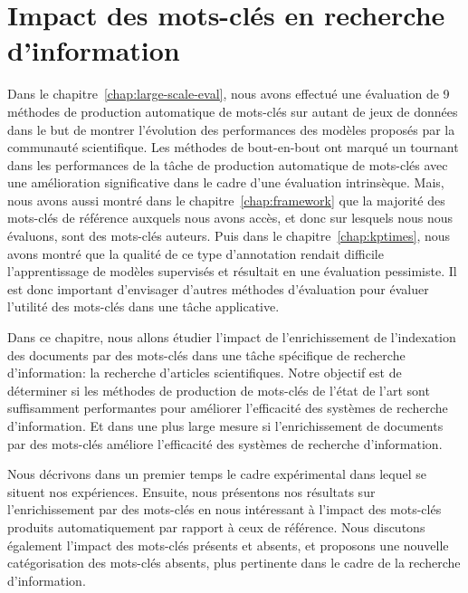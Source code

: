 \chapter{Impact des mots-clés en recherche d'information}\label{chap:ri}

Dans le chapitre~\ref{chap:large-scale-eval}, nous avons effectué une évaluation de 9 méthodes de production automatique de mots-clés sur autant de jeux de données dans le but de montrer l'évolution des performances des modèles proposés par la communauté scientifique.
Les méthodes de bout-en-bout ont marqué un tournant dans les performances de la tâche de production automatique de mots-clés avec une amélioration significative dans le cadre d'une évaluation intrinsèque.
Mais, nous avons aussi montré dans le chapitre~\ref{chap:framework} que la majorité des mots-clés de référence auxquels nous avons accès, et donc sur lesquels nous nous évaluons, sont des mots-clés auteurs.
Puis dans le chapitre~\ref{chap:kptimes}, nous avons montré que la qualité de ce type d'annotation rendait difficile l'apprentissage de modèles supervisés et résultait en une évaluation pessimiste. Il est donc important d'envisager d'autres méthodes d'évaluation pour évaluer l'utilité des mots-clés dans une tâche applicative.

Dans ce chapitre, nous allons étudier l'impact de l'enrichissement de l'indexation des documents par des mots-clés dans une tâche spécifique de recherche d'information: la recherche d'articles scientifiques.
Notre objectif est de déterminer si les méthodes de production de mots-clés de l'état de l'art sont suffisamment performantes pour améliorer l'efficacité des systèmes de recherche d'information.
Et dans une plus large mesure si l'enrichissement de documents par des mots-clés améliore l'efficacité des systèmes de recherche d'information.

Nous décrivons dans un premier temps le cadre expérimental dans lequel se situent nos expériences.
Ensuite, nous présentons nos résultats sur l'enrichissement par des mots-clés en nous intéressant à l'impact des mots-clés produits automatiquement par rapport à ceux de référence.
%
Nous discutons également l'impact des mots-clés présents et absents, et proposons une nouvelle catégorisation des mots-clés absents, plus pertinente dans le cadre de la recherche d'information. 

